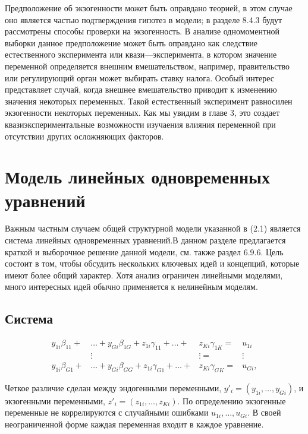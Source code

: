 	
	Предположение об экзогенности может быть оправдано теорией, в этом случае оно является частью подтверждения гипотез в модели; в разделе 8.4.3 будут рассмотрены способы проверки на экзогенность. В анализе одномоментной выборки  данное предположение может быть оправдано как следствие естественного эксперимента или квази---эксперимента, в котором значение переменной определяется внешним вмешательством, например, правительство или регулирующий орган может выбирать ставку налога. Особый интерес представляет случай, когда внешнее вмешательство приводит к изменению значения некоторых переменных. Такой естественный эксперимент равносилен экзогенности некоторых переменных. Как мы увидим в главе 3, это создает квазиэкспериментальные возможности изучаения влияния переменной при отсутствии других осложняющих факторов. 


\section{Модель линейных одновременных уравнений}


Важным частным случаем общей структурной модели указанной в (2.1) является система линейных одновременных уравнений.В данном разделе предлагается краткой и выборочное решение данной модели, см. также раздел 6.9.6. Цель состоит в том, чтобы обсудить нескольких ключевых идей и концепций, которые имеют более общий характер. Хотя анализ ограничен линейными моделями, много интересных идей обычно применяется к нелинейным моделям.
  
\subsection{Система}

\[
\begin{aligned}
y_{1i}\beta_{11}+ &\dots + y_{Gi}\beta_{1G}+z_{1i}\gamma_{11} + \dots + &z_{Ki}\gamma_{1K}=  &u_{1i} \\
                  &\vdots                                               &\vdots           =  &\vdots \\
y_{1i}\beta_{G1}+ &\dots + y_{Gi}\beta_{GG}+z_{1i}\gamma_{G1} + \dots + &z_{Ki}\gamma_{GK}=  &u_{Gi},
\end{aligned}
\]

Четкое различие  сделан между эндогенными переменными, $y'_{i}=(y_{1i},\dots,y_{Gi})$, и экзогенными переменными, $z'_{i}=(z_{1i},\dots,z_{Ki})$. По определению экзогенные переменные не коррелируются с случайными ошибками $u_{1i},\dots,u_{Gi}$. В своей неограниченной форме каждая переменная входит в каждое уравнение. 

